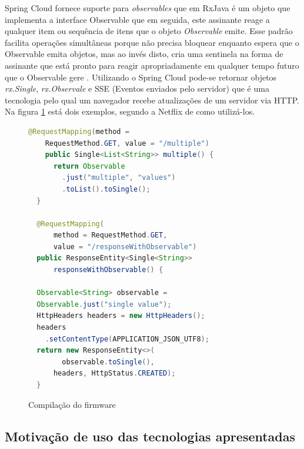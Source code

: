 \documentclass[journal]{IEEEtran}
\begin{document}
Spring Cloud fornece suporte para \emph{observables} que em RxJava é um objeto que implementa a interface Observable que em seguida, este assinante reage a qualquer item ou sequência de itens que o objeto \emph{Observable} emite. Esse padrão facilita operações simultâneas porque não precisa bloquear enquanto espera que o Observable emita objetos, mas ao invés disto, cria uma sentinela na forma de assinante que está pronto para reagir apropriadamente em qualquer tempo futuro que o Observable gere \cite{reactivex2017}. Utilizando o Spring Cloud pode-se retornar objetos \emph{rx.Single}, \emph{rx.Observale} e SSE (Eventos enviados pelo servidor) que é uma tecnologia pelo qual um navegador recebe atualizações de um servidor via HTTP. Na figura \ref{alg:vintedois} está dois exemplos, segundo a Netflix \cite{netflix2017SpringCloud} de como utilizá-los.

\begin{figure}[h]
\centering

\begin{lstlisting}[language=Java]
  @RequestMapping(method =
    RequestMethod.GET, value = "/multiple")
    public Single<List<String>> multiple() {
      return Observable
        .just("multiple", "values")
        .toList().toSingle();
  }

  @RequestMapping(
      method = RequestMethod.GET, 
      value = "/responseWithObservable")
  public ResponseEntity<Single<String>> 
      responseWithObservable() {

  Observable<String> observable = 
  Observable.just("single value");
  HttpHeaders headers = new HttpHeaders();
  headers
    .setContentType(APPLICATION_JSON_UTF8);
  return new ResponseEntity<>(
        observable.toSingle(), 
      headers, HttpStatus.CREATED);
  }
\end{lstlisting}

\caption{Compilação do firmware}
\label{alg:vintedois}
\end{figure}

\subsection{Motivação de uso das tecnologias apresentadas}
\end{document}
